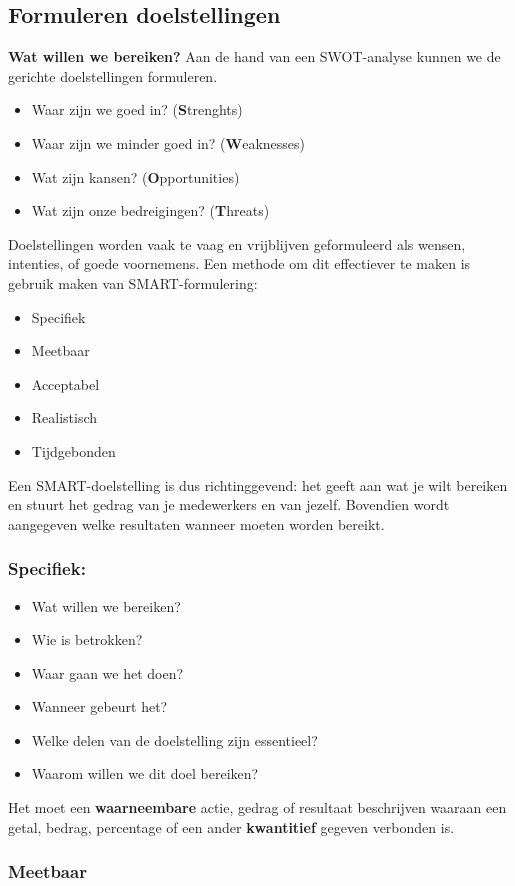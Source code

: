 \documentclass[12pt]{article}
\begin{document}
\subsection{Formuleren doelstellingen}
\textbf{Wat willen we bereiken?}
Aan de hand van een SWOT-analyse kunnen we de gerichte doelstellingen formuleren.
\begin{itemize}
    \item Waar zijn we goed in? (\textbf{S}trenghts)
    \item Waar zijn we minder goed in? (\textbf{W}eaknesses)
    \item Wat zijn kansen? (\textbf{O}pportunities)
    \item Wat zijn onze bedreigingen? (\textbf{T}hreats)
\end{itemize}
Doelstellingen worden vaak te vaag en vrijblijven geformuleerd als wensen, intenties, of goede voornemens. Een methode om dit effectiever te maken is gebruik maken van SMART-formulering:
\begin{itemize}
    \item Specifiek 
    \item Meetbaar
    \item Acceptabel
    \item Realistisch
    \item Tijdgebonden
\end{itemize}
Een SMART-doelstelling is dus richtinggevend: het geeft aan wat je wilt bereiken en stuurt het gedrag van je medewerkers en van jezelf. Bovendien wordt aangegeven welke resultaten wanneer moeten worden bereikt.
\subsubsection{Specifiek:}
\begin{itemize}
    \item Wat willen we bereiken?
    \item Wie is betrokken?
    \item Waar gaan we het doen?
    \item Wanneer gebeurt het?
    \item Welke delen van de doelstelling zijn essentieel?
    \item Waarom willen we dit doel bereiken?
\end{itemize}
Het moet een \textbf{waarneembare} actie, gedrag of resultaat beschrijven waaraan een getal, bedrag, percentage of een ander \textbf{kwantitief} gegeven verbonden is.
\subsubsection{Meetbaar}
\end{document}
